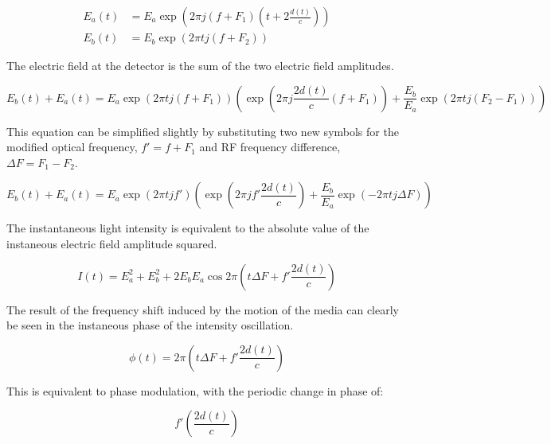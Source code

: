 \begin{align}
E_a(t) & = E_a \exp{\left(2 \pi j (f + F_1) \left( t + 2 \frac{d(t)}{c}\right) \right)}  \\
E_b(t) & = E_b \exp{(2 \pi t j (f + F_2))}
\end{align}

The electric field at the detector is the sum of the two electric field amplitudes.

\begin{dmath}
E_b(t) + E_a(t) = E_a \exp{(2 \pi t j (f + F_1))}\left(\exp{\left(2 \pi j \frac{2 d(t)}{c}(f + F_1)\right)} + \frac{E_b}{E_a} \exp{(2 \pi t j (F_2 - F_1))}\right)
\end{dmath}

This equation can be simplified slightly by substituting two new symbols for the modified optical frequency, $f' = f + F_1$ and RF frequency difference, $\Delta F = F_1 - F_2$.

\begin{dmath}
E_b(t) + E_a(t) = E_a \exp{(2 \pi t j f')}\left(\exp{\left(2 \pi j f' \frac{ 2 d(t)}{c}\right)} + \frac{E_b}{E_a} \exp{(-2 \pi t j \Delta F)}\right)
\end{dmath}

The instantaneous light intensity is equivalent to the absolute value of the instaneous electric field amplitude squared.


\begin{dmath}
I(t) = E_a^2 + E_b^2 + 2 E_b E_a \cos{ 2 \pi \left(t \Delta F + f' \frac{2 d(t)}{c}   \right)}
\end{dmath}

The result of the frequency shift induced by the motion of the media can clearly be seen in the instaneous phase of the intensity oscillation.

\begin{dmath}
\label{eq:phase_aom_doppler}
\phi(t) = 2 \pi \left(t \Delta F + f' \frac{2 d(t)}{c}   \right)
\end{dmath}

This is equivalent to phase modulation, with the periodic change in phase of:

\begin{equation}
f' \left( \frac{2 d(t)}{c} \right)
\end{equation}

